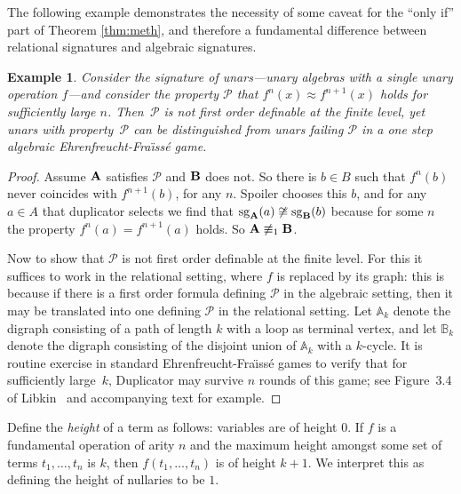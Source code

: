 \documentclass[reqno]{amsart}
\theoremstyle{plain}
\newtheorem{example}[thm]{Example}
\theoremstyle{definition}
\newcommand{\sg}[2]{\mathrm{sg}_{#1}(#2)}
\begin{document}
The following example demonstrates the necessity of some caveat for the ``only if'' part of Theorem \ref{thm:meth}, and therefore a fundamental difference between relational signatures and algebraic signatures.
\begin{example}
Consider the signature of \emph{unars}---unary algebras with a single unary operation $f$---and consider the property $\mathcal{P}$ that $f^n(x)\approx f^{n+1}(x)$ holds for sufficiently large $n$.  Then~$\mathcal{P}$ is not first order definable at the finite level, yet unars with property~$\mathcal{P}$ can be distinguished from unars failing  $\mathcal{P}$ in a one step algebraic Ehrenfreucht-Fra\"{\i}ss\'e game.
\end{example}
\begin{proof}
Assume ${\bf A}$ satisfies $\mathcal{P}$ and  ${\bf B}$ does not.  So there is $b\in B$ such that $f^n(b)$ never coincides with $f^{n+1}(b)$, for any $n$.  Spoiler chooses this $b$, and for any $a\in A$ that duplicator selects we find that $\sg{\bf A}{a}\not\cong \sg{\bf B}{b}$ because for some $n$ the property $f^n(a)=f^{n+1}(a)$ holds.  So ${\bf A}\not\equiv_1{\bf B}$.

Now to show that $\mathcal{P}$ is not first order definable at the finite level.  For this it suffices to work in the relational setting, where $f$ is replaced by its graph: this is because if there is a first order formula defining $\mathcal{P}$ in the algebraic setting, then it may be translated into one defining $\mathcal{P}$ in the relational setting.  Let $\mathbb{A}_k$ denote the digraph consisting of a path of length $k$ with a loop as terminal vertex, and let $\mathbb{B}_k$ denote the digraph consisting of the disjoint union of $\mathbb{A}_k$ with a $k$-cycle.  It is routine exercise in standard  Ehrenfreucht-Fra\"{\i}ss\'e games to verify that for sufficiently large~$k$, Duplicator may survive $n$ rounds of this game; see Figure~3.4 of Libkin~\cite{lib} and accompanying text for example.
\end{proof}


Define the \emph{height} of a term as follows: variables are of height $0$.  If $f$ is a fundamental operation of arity $n$ and the maximum height amongst some set of terms $t_1,\dots,t_n$ is $k$, then $f(t_1,\dots,t_n)$ is of height $k+1$.  We interpret this as defining the height of nullaries to be $1$.
\end{document}
